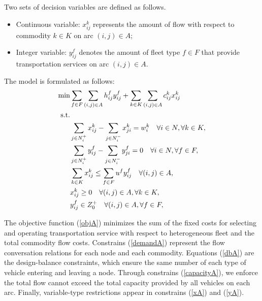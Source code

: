 \documentclass[11pt,nonblindrev,fleqn]{article}
\begin{document}
Two sets of decision variables are defined as follows.
\begin{itemize}
  \item Continuous variable: $x_{ij}^k$ represents the amount of flow with respect to commodity $k\in K$ on arc $(i,j)\in A$;
  \item Integer variable: $y_{ij}^f$ denotes the amount of fleet type $f\in F$ that provide transportation services on arc $(i,j)\in A$.
\end{itemize}

The model is formulated as follows:
\begin{align}
  \min &  \sum_{f\in F}\sum_{(i,j)\in A}h_{ij}^f y_{ij}^f + \sum_{k\in K}\sum_{(i,j)\in A} c_{ij}^k x_{ij}^k   \label{objA}  \\
  \rm{s.t.} \nonumber  \\
         &  \sum_{j\in N_i^+}x_{ij}^k - \sum_{j\in N_i^-}x_{ji}^k = w_i^k     \quad     \forall i\in N, \forall k\in K,     \label{demandA}  \\
         &   \sum_{j\in N_i^+}y_{ij}^f - \sum_{j\in N_i^-}y_{ji}^f = 0  \quad     \forall i\in N, \forall f\in F,   \label{dbA} \\
         &   \sum_{k\in K}x_{ij}^k \leq \sum_{f\in F}u^f y_{ij}^f  \quad  \forall (i,j)\in A,   \label{capacityA} \\
         &    x_{ij}^k \geq 0  \quad  \forall (i,j)\in A, \forall k\in K,   \label{xA} \\
         &   y_{ij}^f \in Z_0^+  \quad  \forall (i,j)\in A,\forall f\in F, \label{yA}
\end{align}

The objective function (\ref{objA}) minimizes the sum of the fixed costs for selecting and operating transportation service with respect to heterogeneous fleet and the total commodity flow costs. Constrains (\ref{demandA}) represent the flow conversation relations for each node and each commodity. Equations (\ref{dbA}) are the design-balance constraints, which ensure the same number of each type of vehicle entering and leaving a node. Through constrains (\ref{capacityA}), we enforce the total flow cannot exceed the total capacity provided by all vehicles on each arc. Finally, variable-type restrictions appear in constrains (\ref{xA}) and (\ref{yA}).
\end{document}
